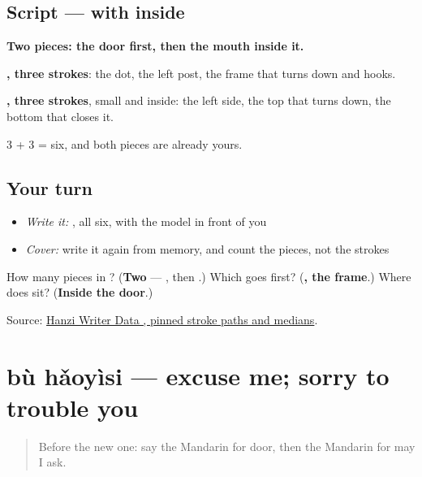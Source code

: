 \subsection*{Script —  with  inside}

\begin{quote}
\end{quote}

\textbf{Two pieces: the door first, then the mouth inside it.}

\textbf{, three strokes}: the dot, the left post, the frame that turns down and hooks.

\textbf{, three strokes}, small and inside: the left side, the top that turns down, the bottom that closes it.

3 + 3 = six, and both pieces are already yours.

\subsection*{Your turn}
\begin{itemize}
\raggedright
  \item \emph{Write it:} , all six, with the model in front of you
  \item \emph{Cover:} write it again from memory, and count the pieces, not the strokes
\end{itemize}

\begin{tcolorbox}[breakable,colback=teal!4,colframe=teal!35!black,title={Before you move on}]
How many pieces in ? (\textbf{Two} — , then .) Which goes first? (\textbf{, the frame}.) Where does  sit? (\textbf{Inside the door}.)

Source: \href{https://raw.githubusercontent.com/chanind/hanzi-writer-data/68d10a4b21150cae5e1ebbd223eed289cf32d90c/data/\%E9\%97\%AE.json}{Hanzi Writer Data , pinned stroke paths and medians}.
\end{tcolorbox}
\section[bù hǎoyìsi]{bù hǎoyìsi — excuse me; sorry to trouble you}

\label{lesson:ZH-C65-buhaoyisi}



\begin{quote}
Before the new one: say the Mandarin for door, then the Mandarin for may I ask.
\end{quote}

